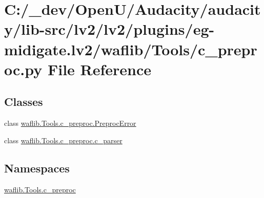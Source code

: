 \hypertarget{lv2_2plugins_2eg-midigate_8lv2_2waflib_2_tools_2c__preproc_8py}{}\section{C\+:/\+\_\+dev/\+Open\+U/\+Audacity/audacity/lib-\/src/lv2/lv2/plugins/eg-\/midigate.lv2/waflib/\+Tools/c\+\_\+preproc.py File Reference}
\label{lv2_2plugins_2eg-midigate_8lv2_2waflib_2_tools_2c__preproc_8py}
\subsection*{Classes}
\begin{DoxyCompactItemize}
\item 
class \hyperlink{classwaflib_1_1_tools_1_1c__preproc_1_1_preproc_error}{waflib.\+Tools.\+c\+\_\+preproc.\+Preproc\+Error}
\item 
class \hyperlink{classwaflib_1_1_tools_1_1c__preproc_1_1c__parser}{waflib.\+Tools.\+c\+\_\+preproc.\+c\+\_\+parser}
\end{DoxyCompactItemize}
\subsection*{Namespaces}
\begin{DoxyCompactItemize}
\item 
 \hyperlink{namespacewaflib_1_1_tools_1_1c__preproc}{waflib.\+Tools.\+c\+\_\+preproc}
\end{DoxyCompactItemize}
